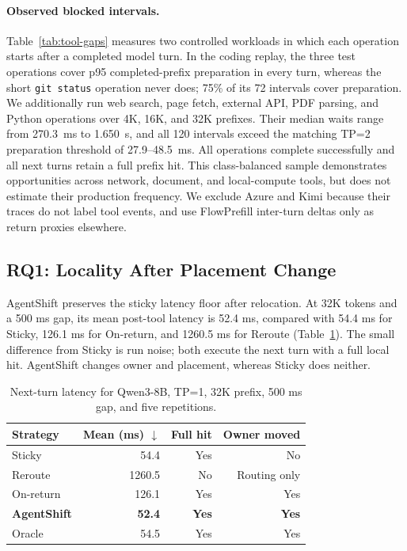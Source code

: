 \paragraph{Observed blocked intervals.}
Table~\ref{tab:tool-gaps} measures two controlled workloads in which each operation starts after a completed model turn. In the coding replay, the three test operations cover p95 completed-prefix preparation in every turn, whereas the short \texttt{git status} operation never does; 75\% of its 72 intervals cover preparation. We additionally run web search, page fetch, external API, PDF parsing, and Python operations over 4K, 16K, and 32K prefixes. Their median waits range from 270.3~ms to 1.650~s, and all 120 intervals exceed the matching TP=2 preparation threshold of 27.9--48.5~ms. All operations complete successfully and all next turns retain a full prefix hit. This class-balanced sample demonstrates opportunities across network, document, and local-compute tools, but does not estimate their production frequency. We exclude Azure and Kimi because their traces do not label tool events, and use FlowPrefill inter-turn deltas only as return proxies elsewhere.

\subsection{RQ1: Locality After Placement Change}\label{rq1-locality-after-placement-change}

AgentShift preserves the sticky latency floor after relocation. At 32K tokens and a 500 ms gap, its mean post-tool latency is 52.4 ms, compared with 54.4 ms for Sticky, 126.1 ms for On-return, and 1260.5 ms for Reroute (Table~\ref{tab:headline}). The small difference from Sticky is run noise; both execute the next turn with a full local hit. AgentShift changes owner and placement, whereas Sticky does neither.

\begin{table}[t]
\centering
\small
\caption{Next-turn latency for Qwen3-8B, TP=1, 32K prefix, 500 ms gap, and five repetitions.}
\label{tab:headline}
\begin{tabular}{lrrr}
\toprule
Strategy & Mean (ms) $\downarrow$ & Full hit & Owner moved \\
\midrule
Sticky & 54.4 & Yes & No \\
Reroute & 1260.5 & No & Routing only \\
On-return & 126.1 & Yes & Yes \\
\textbf{AgentShift} & \textbf{52.4} & \textbf{Yes} & \textbf{Yes} \\
Oracle & 54.5 & Yes & Yes \\
\bottomrule
\end{tabular}
\end{table}


